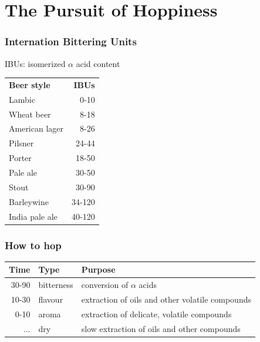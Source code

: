 \documentclass{beamer}
\begin{document}
\section{The Pursuit of Hoppiness}
\begin{frame}\frametitle{Internation Bittering Units}
  IBUs: isomerized $\alpha$ acid content
  \begin{table}[]
    \centering
    \label{my-label}
    \begin{tabular}{lr}
      \textbf{Beer style} & \textbf{IBUs} \\
      Lambic              & 0-10          \\
      Wheat beer          & 8-18          \\
      American lager      & 8-26          \\
      Pilsner             & 24-44         \\
      Porter              & 18-50         \\
      Pale ale            & 30-50         \\
      Stout               & 30-90         \\
      Barleywine          & 34-120        \\
      India pale ale      & 40-120
    \end{tabular}
  \end{table}
\end{frame}

\begin{frame}\frametitle{How to hop}
\begin{table}[]
\centering
\begin{tabular}{rll}
  \textbf{Time} & \textbf{Type} & \textbf{Purpose}   \\
  \hline
30-90 & bitterness & conversion of $\alpha$ acids  \\
10-30 & flavour & extraction of oils and other volatile compounds  \\
0-10 & aroma & extraction of delicate, volatile compounds \\
... & dry & slow extraction of oils and other compounds \\
\end{tabular}
\end{table}
\end{frame}
\end{document}

